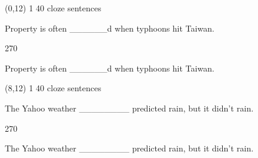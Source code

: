 \documentclass[a4paper]{article}
\newenvironment{itemize*}%
{\begin{itemize}%
 \setlength{\itemsep}{0.5cm}%
 \setlength{\parsep}{0pt}%
 \setlength{\parskip}{0pt}}%
{\end{itemize}}
\newcommand{\mycard}[3]{%
	\small #1 #2
	\par
	\parbox[t][6.8cm][c]{9.5cm}{%
	\par
	\myleft{#3}
	\par
	\myright{#3}
	}
}
\newcommand{\myleft}[1]{%
	\begin{sideways}
	\hspace*{-0.9cm}
		\parbox[t][2.7cm][t]{6.5cm}{%
		\large #1
		}
	\end{sideways}
}
\newcommand{\myright}[1]{%
	\hspace*{6.5cm}
	\begin{turn}{270}
	\hspace*{-7.1cm}
		\parbox[t][2.7cm][t]{6.5cm}{%
		\large #1
		}
	\end{turn}
}
\begin{document}
\begin{textblock}{8}(0,12)
\mycard{1}{40 cloze sentences}{
\begin{itemize*}
\item Property is often \_\_\_\_\_\_d when typhoons hit Taiwan.
\end{itemize*}
}
\end{textblock}

\begin{textblock}{8}(8,12)
\mycard{1}{40 cloze sentences}{
\begin{itemize*}
\item The Yahoo weather \_\_\_\_\_\_\_\_ predicted rain, but it didn't rain.
\end{itemize*}
}
\end{textblock}

\null
\newpage
\end{document}

